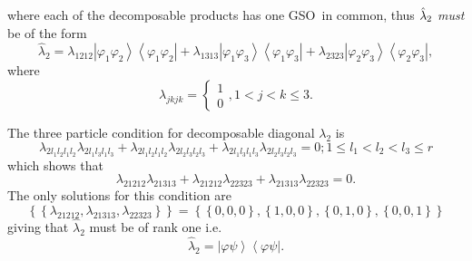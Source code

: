 \documentclass[12pt]{article}
\begin{document}
where each of the decomposable products has one GSO\ in common, thus $\hat{%
\lambda}_{2}$ \emph{must} be of the form 
\begin{equation}
\hat{\lambda}_{2}=\lambda _{1212}\left\vert \varphi _{1}\varphi
_{2}\right\rangle \left\langle \varphi _{1}\varphi _{2}\right\vert +\lambda
_{1313}\left\vert \varphi _{1}\varphi _{3}\right\rangle \left\langle \varphi
_{1}\varphi _{3}\right\vert +\lambda _{2323}\left\vert \varphi _{2}\varphi
_{3}\right\rangle \left\langle \varphi _{2}\varphi _{3}\right\vert ,
\end{equation}%
where 
\begin{equation}
\lambda _{jkjk}=\left\{ 
\begin{array}{c}
1 \\ 
0%
\end{array}%
\right. ,1<j<k\leq 3.
\end{equation}

The three particle condition for decomposable diagonal $\lambda _{2}$ is 
\begin{equation}
\lambda _{2l_{1}l_{2}l_{1}l_{2}}\lambda _{2l_{1}l_{3}l_{1}l_{3}}+\lambda
_{2l_{1}l_{2}l_{1}l_{2}}\lambda _{2l_{2}l_{3}l_{2}l_{3}}+\lambda
_{2l_{1}l_{3}l_{1}l_{3}}\lambda _{2l_{2}l_{3}l_{2}l_{3}}=0;1\leq
l_{1}<l_{2}<l_{3}\leq r
\end{equation}%
which shows that 
\begin{equation}
\lambda _{21212}\lambda _{21313}+\lambda _{21212}\lambda _{22323}+\lambda
_{21313}\lambda _{22323}=0.
\end{equation}%
The only solutions for this condition are 
\begin{equation}
\left\{ \left\{ \lambda _{21212},\lambda _{21313},\lambda _{22323}\right\}
\right\} =\left\{ \left\{ 0,0,0\right\} ,\left\{ 1,0,0\right\} ,\left\{
0,1,0\right\} ,\left\{ 0,0,1\right\} \right\} 
\end{equation}%
giving that $\hat{\lambda}_{2}$ must be of rank one i.e. 
\begin{equation}
\hat{\lambda}_{2}=\left\vert \varphi \psi \right\rangle \left\langle \varphi
\psi \right\vert .
\end{equation}
\end{document}
